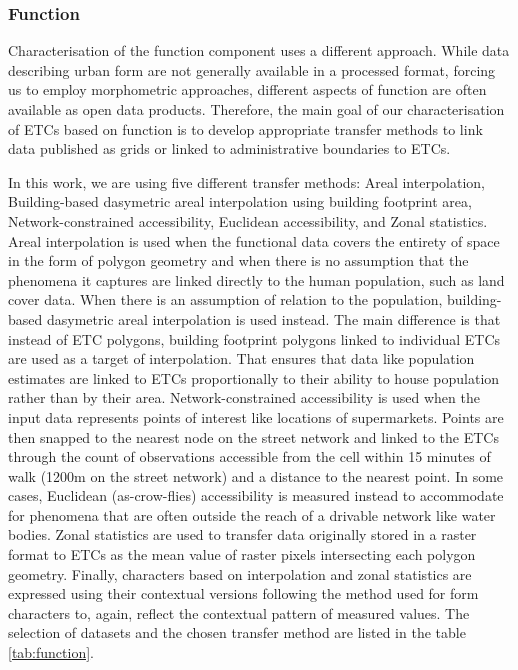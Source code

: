 \subsubsection*{Function}
Characterisation of the function component uses a different approach. While data
describing urban form are not generally available in a processed format, forcing us to employ morphometric approaches, different aspects of function are often available as
open data products. Therefore, the main goal of our characterisation of ETCs based on
function is to develop appropriate transfer methods to link data published as grids or
linked to administrative boundaries to ETCs.

In this work, we are using five different transfer methods: Areal interpolation,
Building-based dasymetric areal interpolation\cite{eli_knaap_2021_5047613} using building footprint area, Network-constrained accessibility,
Euclidean accessibility, and Zonal statistics. Areal interpolation is used when the
functional data covers the entirety of space in the
form of polygon geometry and when there is no assumption that the phenomena it captures
are linked directly to the human population, such as land cover data. When there is
an assumption of relation to the population, building-based dasymetric areal
interpolation is used instead. The main difference is that instead of ETC polygons,
building footprint polygons linked to individual ETCs are used as a target of
interpolation. That ensures that data like population estimates are linked to ETCs
proportionally to their ability to house population rather than by their area.
Network-constrained accessibility is used when the input data represents points of
interest like locations of supermarkets. Points are then snapped to the nearest node on
the street network and linked to the ETCs through the count of observations
accessible from the cell within 15 minutes of walk (1200m on the street network) and a distance to the nearest point. In
some cases, Euclidean (as-crow-flies) accessibility is measured instead to accommodate
for phenomena that are often outside the reach of a drivable network like water bodies.
Zonal statistics are used to transfer data originally stored in a raster
format to ETCs as the mean value of raster pixels intersecting each polygon
geometry. Finally, characters based on interpolation and zonal statistics are expressed
using their contextual versions following the method used for form characters to, again,
reflect the contextual pattern of measured values. The selection of datasets and the chosen
transfer method are listed in the table \ref{tab:function}.

